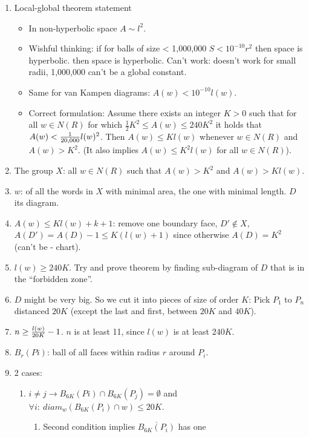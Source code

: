 \documentclass[11pt]{article} \usepackage{amssymb}
\newcommand{\half}{{\textstyle \frac12}}
\begin{document}
\begin{enumerate}
\begin{enumerate}
  \end{enumerate}
  \item Local-global theorem statement
    \begin{itemize}
    \item In non-hyperbolic space $A\sim l^2$. 
    \item Wishful thinking: if for balls of size < 1,000,000
      $S<10^{-10} r^2$ then space is hyperbolic. 
      then space is hyperbolic. Can't work: doesn't work for small radii,
      1,000,000 can't be a global constant.
    \item Same for van Kampen diagrams: $A(w)<10^{-10}l(w)$.
    \item Correct formulation: Assume there exists an integer $K>0$ such that
      for all $w\in N(R)$ for which $\half K^2\leq A(w)\leq 240K^2$ it holds that
      $A(w)<{1\over 20,000}l(w)^2$. Then $A(w)\leq Kl(w)$ whenever $w\in N(R)$ and $A(w)>K^2$. 
      (It also implies
      $A(w)\leq K^2l(w)$ for all $w\in N(R)$).    
    \end{itemize}
  \item The group $X$: all $w\in N(R)$ such that $A(w)>K^2$ and $A(w)>Kl(w)$.
  \item $w$: of all the words in $X$ with minimal area, the one with 
    minimal length. $D$ its diagram.
  \item $A(w)\leq Kl(w)+k+1$: remove one boundary face, $D'\not \in X$,
    $A(D') = A(D)-1\leq K(l(w)+1)$ since otherwise $A(D)=K^2$ (can't be - chart).
  \item $l(w)\geq 240K$. Try and prove theorem by finding sub-diagram of $D$ that
    is in the ``forbidden zone''.
  \item $D$ might be very big. So we cut it into pieces of size of order $K$:
    Pick $P_1$ to $P_n$ distanced $20K$ 
    (except the last and first, between $20K$
    and $40K$).
  \item $n\geq {l(w)\over 20K}-1$. $n$ is at least 11, since $l(w)$ is at least $240K$.
  \item $B_r(Pi)$: ball of all faces within radius $r$ around $P_i$.
  \item 2 cases:
    \begin{enumerate}
    \item $i\neq j\to B_{6K}(Pi)\cap B_{6K}(P_j)=\emptyset$ and 
      $\forall i:\:diam_w(B_{6K}(P_i)\cap w)\leq 20K$.
      \begin{enumerate}
      \item Second condition implies $\overline{B_{6K}(P_i)}$ has one 

\end{enumerate}
\end{enumerate}
\end{enumerate}
\end{document}
